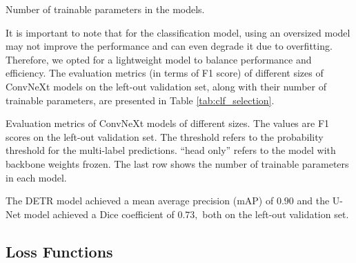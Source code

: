 \begin{table}[!htp]
\centering

\caption{Number of trainable parameters in the models.}
\label{tab:model_num_params}
\end{table}

It is important to note that for the classification model, using an oversized model may not improve the performance and can even degrade it due to overfitting. Therefore, we opted for a lightweight model to balance performance and efficiency. The evaluation metrics (in terms of F1 score) of different sizes of ConvNeXt models on the left-out validation set, along with their number of trainable parameters, are presented in Table \ref{tab:clf_selection}.

\begin{table}[!htp]
\centering

\caption{Evaluation metrics of ConvNeXt models of different sizes. The values are F1 scores on the left-out validation set. The threshold refers to the probability threshold for the multi-label predictions. ``head only'' refers to the model with backbone weights frozen. The last row shows the number of trainable parameters in each model.}
\label{tab:clf_selection}
\end{table}

The DETR model achieved a mean average precision (mAP) of $0.90$ and the U-Net model achieved a Dice coefficient of $0.73,$ both on the left-out validation set.

\subsection{Loss Functions}
\label{subsec:loss_functions}


